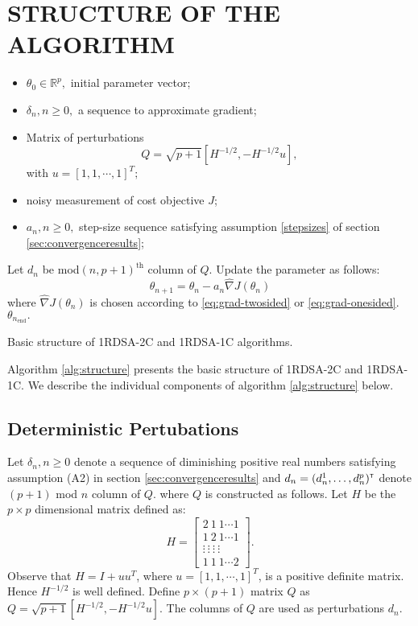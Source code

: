 \documentclass[letterpaper, 10 pt, conference]{ieeeconf}  %
\begin{document}
\section{STRUCTURE OF THE ALGORITHM}
\label{sec:algo}
\begin{algorithm}[t]
\begin{algorithmic}
\begin{itemize}
 \item $\theta_0 \in \mathbb{R}^p,$ initial parameter vector;
 \item $\delta_n, n \geq 0,$ a sequence to approximate gradient;
 \item Matrix of perturbations $$Q=\sqrt{p+1}[H^{-1/2},-H^{-1/2}u],$$ 
 with $u=[1,1,\cdots,1]^T;$
 \item noisy measurement of cost objective $J$;
 \item $a_n, n \geq 0,$ step-size sequence satisfying assumption \ref{stepsizes} of 
 section \ref{sec:convergenceresults};
\end{itemize}
	\State Let $d_n$ be mod$(n,p+1)^{\text{th}}$ column of $Q$. 
	\State Update the parameter as follows:
  \begin{equation*}
  \theta_{n+1}=\theta_n-a_n \widehat\nabla J(\theta_n)
  \end{equation*}
where $\widehat\nabla J(\theta_n)$ is chosen according to \eqref{eq:grad-twosided} 
or \eqref{eq:grad-onesided}. 
\EndFor
{} $\theta_{n_{\text{end}}}.$
\end{algorithmic}
\caption{Basic structure of 1RDSA-2C and 1RDSA-1C algorithms.}
\label{alg:structure}
\end{algorithm}
Algorithm \ref{alg:structure} presents the basic structure of 
1RDSA-2C and 1RDSA-1C. We describe the individual 
components of algorithm \ref{alg:structure} below.
\subsection{Deterministic Pertubations}
Let $\delta_n, n\geq 0$ denote a sequence of diminishing positive real numbers satisfying 
assumption (A2) in section \ref{sec:convergenceresults} and 
$d_n = (d_n^1,\ldots,d_n^p)^\mathsf{\scriptscriptstyle T}$ denote $(p+1)$ mod $n$ column of $Q.$
where $Q$ is constructed as follows. 
Let $H$ be the $p \times p$ dimensional matrix defined as:
\begin{equation}\label{eq:H}
H = \left[\begin{array}{cccc}
2 \ 1 \ 1 \cdots 1\\ 
1 \ 2 \ 1 \cdots 1 \\
\vdots \ \vdots \ \vdots \ \vdots\\
1 \ 1 \ 1 \cdots 2
\end{array}\right].
\end{equation}
Observe that $H=I+uu^T$, where $u=[1,1,\cdots,1]^T$, is a positive definite matrix. Hence $H^{-1/2}$ is well defined.
Define $p\times (p+1)$ matrix $Q$ as $Q=\sqrt{p+1}[H^{-1/2},-H^{-1/2}u].$ The columns of
$Q$ are used as perturbations $d_n.$
\end{document}

